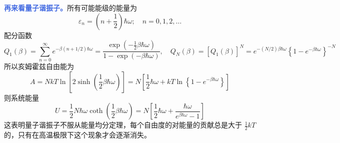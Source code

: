 \textcolor{RoyalBlue}{\textbf{\kaishu 再来看量子谐振子。}}所有可能能级的能量为
\begin{equation}
    \varepsilon_n=\left(n+\frac{1}{2}\right) \hbar \omega ; \quad n=0,1,2, \ldots
\end{equation}
配分函数
\begin{equation}
    Q_1(\beta)=\sum_{n=0}^{\infty} e^{-\beta(n+1 / 2) \hbar \omega}=\frac{\exp \left(-\frac{1}{2} \beta \hbar \omega\right)}{1-\exp (-\beta \hbar \omega)} ,\quad 
    Q_N(\beta)=\left[Q_1(\beta)\right]^N=e^{-(N / 2) \beta \hbar \omega}\left\{1-e^{-\beta \hbar \omega}\right\}^{-N}
\end{equation}
所以亥姆霍兹自由能为
\begin{equation}
    A=N k T \ln \left[2 \sinh \left(\frac{1}{2} \beta \hbar \omega\right)\right]=N\left[\frac{1}{2} \hbar \omega+k T \ln \left\{1-e^{-\beta \hbar \omega}\right\}\right]
\end{equation}
则系统能量
\begin{equation}
    U=\frac{1}{2} N \hbar \omega \operatorname{coth}\left(\frac{1}{2} \beta \hbar \omega\right)=N\left[\frac{1}{2} \hbar \omega+\frac{\hbar \omega}{e^{\beta \hbar \omega}-1}\right]
\end{equation}
这表明量子谐振子不服从能量均分定理，每个自由度的对能量的贡献总是大于 $ \frac{1}{2}  kT$ 的，只有在高温极限下这个现象才会逐渐消失。

